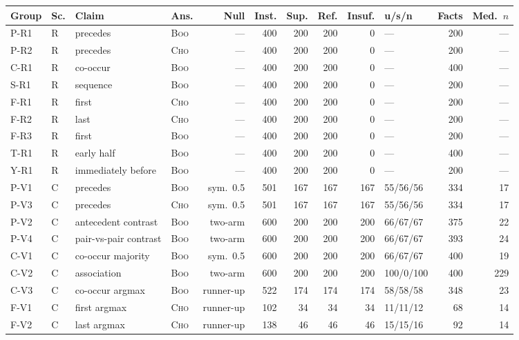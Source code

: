 \begin{table}[tp]
\centering
\scriptsize
\setlength{\tabcolsep}{3.5pt}
\begin{tabular}{llllrrrrrlrr}
\toprule
Group & Sc. & Claim & Ans. & Null & Inst. & Sup. & Ref. & Insuf. & u/s/n & Facts & Med.\ $n$ \\
\midrule
P-R1 & R & precedes & \textsc{Boo} & --- & 400 & 200 & 200 & 0 & --- & 200 & --- \\
P-R2 & R & precedes & \textsc{Cho} & --- & 400 & 200 & 200 & 0 & --- & 200 & --- \\
C-R1 & R & co-occur & \textsc{Boo} & --- & 400 & 200 & 200 & 0 & --- & 400 & --- \\
S-R1 & R & sequence & \textsc{Boo} & --- & 400 & 200 & 200 & 0 & --- & 200 & --- \\
F-R1 & R & first & \textsc{Cho} & --- & 400 & 200 & 200 & 0 & --- & 200 & --- \\
F-R2 & R & last & \textsc{Cho} & --- & 400 & 200 & 200 & 0 & --- & 200 & --- \\
F-R3 & R & first & \textsc{Boo} & --- & 400 & 200 & 200 & 0 & --- & 200 & --- \\
T-R1 & R & early half & \textsc{Boo} & --- & 400 & 200 & 200 & 0 & --- & 400 & --- \\
Y-R1 & R & immediately before & \textsc{Boo} & --- & 400 & 200 & 200 & 0 & --- & 200 & --- \\
\midrule
P-V1 & C & precedes & \textsc{Boo} & sym.\ 0.5 & 501 & 167 & 167 & 167 & 55/56/56 & 334 & 17 \\
P-V3 & C & precedes & \textsc{Cho} & sym.\ 0.5 & 501 & 167 & 167 & 167 & 55/56/56 & 334 & 17 \\
P-V2 & C & antecedent contrast & \textsc{Boo} & two-arm & 600 & 200 & 200 & 200 & 66/67/67 & 375 & 22 \\
P-V4 & C & pair-vs-pair contrast & \textsc{Boo} & two-arm & 600 & 200 & 200 & 200 & 66/67/67 & 393 & 24 \\
C-V1 & C & co-occur majority & \textsc{Boo} & sym.\ 0.5 & 600 & 200 & 200 & 200 & 66/67/67 & 400 & 19 \\
C-V2 & C & association & \textsc{Boo} & two-arm & 600 & 200 & 200 & 200 & 100/0/100 & 400 & 229 \\
C-V3 & C & co-occur argmax & \textsc{Boo} & runner-up & 522 & 174 & 174 & 174 & 58/58/58 & 348 & 23 \\
F-V1 & C & first argmax & \textsc{Cho} & runner-up & 102 & 34 & 34 & 34 & 11/11/12 & 68 & 14 \\
F-V2 & C & last argmax & \textsc{Cho} & runner-up & 138 & 46 & 46 & 46 & 15/15/16 & 92 & 14 \\

\end{tabular}
\end{table}

